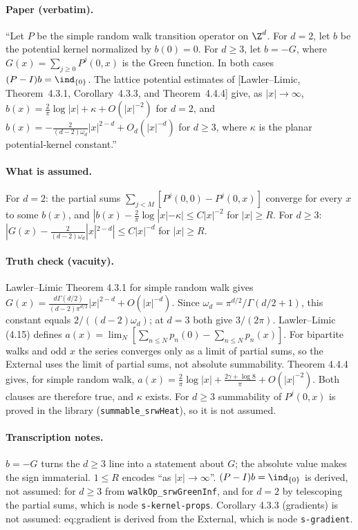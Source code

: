 \paragraph{Paper (verbatim).} ``Let $P$ be the simple random walk transition operator on $\Z^d$.
For $d=2$, let $b$ be the potential kernel normalized by $b(0)=0$. For $d\geq3$, let $b=-G$, where
$G(x)=\sum_{j\geq0}P^j(0,x)$ is the Green function. In both cases $(P-I)b=\ind_{\{0\}}$. The lattice
potential estimates of [Lawler--Limic, Theorem~4.3.1, Corollary~4.3.3, and Theorem~4.4.4] give, as
$|x|\to\infty$, $b(x)=\frac2\pi\log|x|+\kappa+O(|x|^{-2})$ for $d=2$, and
$b(x)=-\frac{2}{(d-2)\omega_d}|x|^{2-d}+O_d(|x|^{-d})$ for $d\geq3$, where $\kappa$ is the planar
potential-kernel constant.''
\paragraph{What is assumed.} For $d=2$: the partial sums $\sum_{j<M}[P^j(0,0)-P^j(0,x)]$ converge
for every $x$ to some $b(x)$, and $|b(x)-\frac2\pi\log|x|-\kappa|\le C|x|^{-2}$ for $|x|\ge R$. For
$d\ge3$: $|G(x)-\frac2{(d-2)\omega_d}|x|^{2-d}|\le C|x|^{-d}$ for $|x|\ge R$.
\paragraph{Truth check (vacuity).} Lawler--Limic Theorem 4.3.1 for simple random walk gives
$G(x)=\frac{d\Gamma(d/2)}{(d-2)\pi^{d/2}}|x|^{2-d}+O(|x|^{-d})$. Since
$\omega_d=\pi^{d/2}/\Gamma(d/2+1)$, this constant equals $2/((d-2)\omega_d)$; at $d=3$ both give
$3/(2\pi)$. Lawler--Limic (4.15) defines $a(x)=\lim_N[\sum_{n\le N}p_n(0)-\sum_{n\le N}p_n(x)]$. For
bipartite walks and odd $x$ the series converges only as a limit of partial sums, so the External
uses the limit of partial sums, not absolute summability. Theorem 4.4.4 gives, for simple random
walk, $a(x)=\frac2\pi\log|x|+\frac{2\gamma+\log8}\pi+O(|x|^{-2})$. Both clauses are therefore true, and
$\kappa$ exists. For $d\ge3$ summability of $P^j(0,x)$ is proved in the library
(\texttt{summable\_srwHeat}), so it is not assumed.
\paragraph{Transcription notes.} $b=-G$ turns the $d\ge3$ line into a statement about $G$; the
absolute value makes the sign immaterial. $1\le R$ encodes ``as $|x|\to\infty$''. $(P-I)b=\ind_{\{0\}}$
is derived, not assumed: for $d\ge3$ from \texttt{walkOp\_srwGreenInf}, and for $d=2$ by telescoping the
partial sums, which is node \texttt{s-kernel-props}. Corollary 4.3.3 (gradients) is not assumed:
eq:gradient is derived from the External, which is node \texttt{s-gradient}.
